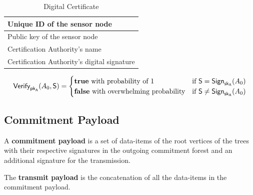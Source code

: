 \documentclass[%
  slidesonly,%
  semlayer%
  ]{seminar}                                  %
\newcommand{\sk}{\sf{sk}}
\newcommand{\pk}{\sf{pk}}
\begin{document}
\begin{slide}
      \begin{table}[!htb] 
          \caption{Digital Certificate}
          \label{table:digital-certificate}
          \centering
          \begin{tabular}{ |l| }
              \hline
              Unique ID of the sensor node \\
              \hline
              Public key of the sensor node \\  
              \hline
              Certification Authority's name \\
              \hline
              Certification Authority's digital signature \\
              \hline
          \end{tabular}
      \end{table}

      \begin{equation}
        \textsf{Verify}_{\pk_{A}}(A_{0},\textsf{S}) = 
        \begin{cases}
         \textbf{true}\ \mbox{with probability of 1} & \mbox{if}\ \textsf{S} = \textsf{Sign}_{\sk_{A}}(A_{0})\\
         \textbf{false}\ \mbox{with overwhelming probability} & \mbox{if}\ \textsf{S} \neq \textsf{Sign}_{\sk_{A}}(A_{0})
        \end{cases}
      \end{equation}

      \clearpage

    \subsection*{Commitment Payload}
        A \textbf{commitment payload} is a set of data-items of the root vertices of the trees with their respective signatures in the outgoing commitment forest and an additional signature for the transmission.
      
        The \textbf{transmit payload} is the concatenation of all the data-items in the commitment payload.
        \clearpage


\end{slide}
\end{document}
